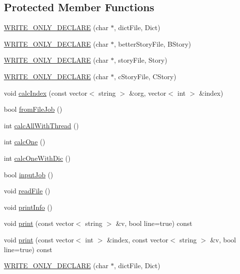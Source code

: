 \subsection*{Protected Member Functions}
\begin{DoxyCompactItemize}
\item 
\hyperlink{class_a_p_p_a6395700a096545c9cb93ed220324efee}{W\+R\+I\+T\+E\+\_\+\+O\+N\+L\+Y\+\_\+\+D\+E\+C\+L\+A\+R\+E} (char $\ast$, dict\+File, Dict)
\item 
\hyperlink{class_a_p_p_af01ec83f01316bfff6a546ea193bd78d}{W\+R\+I\+T\+E\+\_\+\+O\+N\+L\+Y\+\_\+\+D\+E\+C\+L\+A\+R\+E} (char $\ast$, better\+Story\+File, B\+Story)
\item 
\hyperlink{class_a_p_p_adf8e3638cc483b9f8835f22c3cefa1d8}{W\+R\+I\+T\+E\+\_\+\+O\+N\+L\+Y\+\_\+\+D\+E\+C\+L\+A\+R\+E} (char $\ast$, story\+File, Story)
\item 
\hyperlink{class_a_p_p_a3f492a4caa57a2cb5d2d8ef4b2171a26}{W\+R\+I\+T\+E\+\_\+\+O\+N\+L\+Y\+\_\+\+D\+E\+C\+L\+A\+R\+E} (char $\ast$, c\+Story\+File, C\+Story)
\item 
void \hyperlink{class_a_p_p_a329336a84831c48108262bd320944871}{calc\+Index} (const vector$<$ string $>$ \&org, vector$<$ int $>$ \&index)
\item 
bool \hyperlink{class_a_p_p_ab13dec33bbb35a260982031798af0566}{from\+File\+Job} ()
\item 
int \hyperlink{class_a_p_p_a2dfbe5c80d4997895be73f5134b1806e}{calc\+All\+With\+Thread} ()
\item 
int \hyperlink{class_a_p_p_adf4d3aa3c292a553ba12ad4d4adb8ed8}{calc\+One} ()
\item 
int \hyperlink{class_a_p_p_a6d7ca0077e251d59d0abba39ccfacd0a}{calc\+One\+With\+Dic} ()
\item 
bool \hyperlink{class_a_p_p_abe394dad8124de2b16ca6fa15fc1031f}{input\+Job} ()
\item 
void \hyperlink{class_a_p_p_a28855295319df5522e17b396e98a0134}{read\+File} ()
\item 
void \hyperlink{class_a_p_p_a7d0e3d031b5842c00910a734da39d027}{print\+Info} ()
\item 
void \hyperlink{class_a_p_p_aef7c54038f2695d4993d2f43ae535f1e}{print} (const vector$<$ string $>$ \&v, bool line=true) const 
\item 
void \hyperlink{class_a_p_p_a79b3882decc18c22c53d7bf9c1738201}{print} (const vector$<$ int $>$ \&index, const vector$<$ string $>$ \&v, bool line=true) const 
\item 
\hyperlink{class_a_p_p_a6395700a096545c9cb93ed220324efee}{W\+R\+I\+T\+E\+\_\+\+O\+N\+L\+Y\+\_\+\+D\+E\+C\+L\+A\+R\+E} (char $\ast$, dict\+File, Dict)

\end{DoxyCompactItemize}
